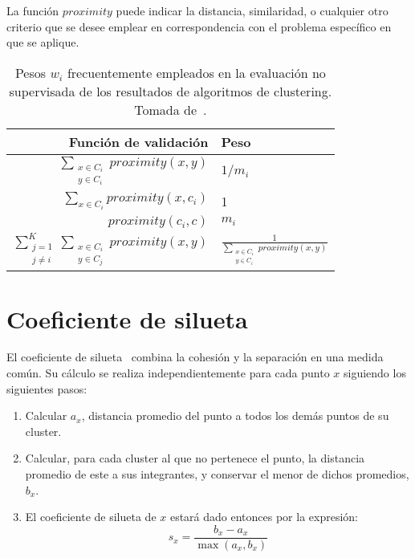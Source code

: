 La función $proximity$ puede indicar la distancia, similaridad, o cualquier otro criterio que se desee emplear en correspondencia con el problema específico en que se aplique.

\begin{table}[H]
    \centering
    \begin{tabular}{rl}
        \hline
        Función de validación & Peso                                                                                    \\  \hline
        $\sum_{\substack{x\in C_i \\ y\in C_i}} proximity(x,y)$                                      & $1/m_i$                                                                       \\
        $\sum_{x\in C_i} proximity(x,c_i)$                                                           & 1                                                                                        \\
        $proximity(c_i , c)$                                                                         & $m_i$                                                                                     \\
        $\sum_{\substack{j=1 \\ j\neq i}}^{K}\sum_{\substack{x\in C_i \\ y\in C_j}} proximity(x, y)$ & $\frac{1}{\sum_{\substack{x\in C_i \\ y\in C_i}} proximity(x, y)}$
    \end{tabular}
    \caption{Pesos $w_i$ frecuentemente empleados en la evaluación no supervisada de los resultados de algoritmos de clustering.
    Tomada de~\cite{Tan05}.}
    \label{table:validity-weights}
\end{table}

\section{Coeficiente de silueta}\label{sec:coeficienteDeSilueta}

El coeficiente de silueta~\cite{Rousseeuw87, Tan05} combina la cohesión y la separación en una medida común.
Su cálculo se realiza independientemente para cada punto $x$ siguiendo los siguientes pasos:

\begin{enumerate}
    \item Calcular $a_x$, distancia promedio del punto a todos los demás puntos de su cluster.
    \item Calcular, para cada cluster al que no pertenece el punto, la distancia promedio de este a sus integrantes, y conservar el menor de dichos promedios, $b_x$.
    \item El coeficiente de silueta de $x$ estará dado entonces por la expresión:
    \begin{equation}
        \label{eq:silhouette-coefficient}
        s_x = \frac{b_x - a_x}{\max{(a_x, b_x)}}
    \end{equation}
\end{enumerate}


